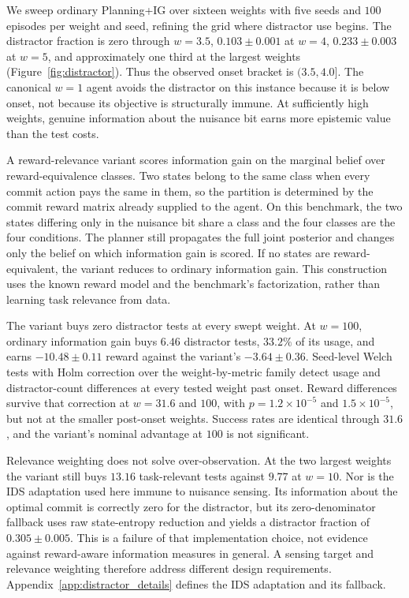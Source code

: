 \documentclass[manuscript, screen, review]{jair}
\begin{document}
We sweep ordinary Planning+IG over sixteen weights with five seeds and $100$ episodes per weight and seed, refining the grid where distractor use begins. The distractor fraction is zero through $w{=}3.5$, $0.103\pm0.001$ at $w{=}4$, $0.233\pm0.003$ at $w{=}5$, and approximately one third at the largest weights (Figure~\ref{fig:distractor}). Thus the observed onset bracket is $(3.5,4.0]$. The canonical $w{=}1$ agent avoids the distractor on this instance because it is below onset, not because its objective is structurally immune. At sufficiently high weights, genuine information about the nuisance bit earns more epistemic value than the test costs.

A reward-relevance variant scores information gain on the marginal belief over reward-equivalence classes. Two states belong to the same class when every commit action pays the same in them, so the partition is determined by the commit reward matrix already supplied to the agent. On this benchmark, the two states differing only in the nuisance bit share a class and the four classes are the four conditions. The planner still propagates the full joint posterior and changes only the belief on which information gain is scored. If no states are reward-equivalent, the variant reduces to ordinary information gain. This construction uses the known reward model and the benchmark's factorization, rather than learning task relevance from data.

The variant buys zero distractor tests at every swept weight. At $w{=}100$, ordinary information gain buys $6.46$ distractor tests, $33.2\%$ of its usage, and earns $-10.48\pm0.11$ reward against the variant's $-3.64\pm0.36$. Seed-level Welch tests with Holm correction over the weight-by-metric family detect usage and distractor-count differences at every tested weight past onset. Reward differences survive that correction at $w{=}31.6$ and $100$, with $p=1.2{\times}10^{-5}$ and $1.5{\times}10^{-5}$, but not at the smaller post-onset weights. Success rates are identical through $31.6$, and the variant's nominal advantage at $100$ is not significant.

Relevance weighting does not solve over-observation. At the two largest weights the variant still buys $13.16$ task-relevant tests against $9.77$ at $w{=}10$. Nor is the IDS adaptation used here immune to nuisance sensing. Its information about the optimal commit is correctly zero for the distractor, but its zero-denominator fallback uses raw state-entropy reduction and yields a distractor fraction of $0.305\pm0.005$. This is a failure of that implementation choice, not evidence against reward-aware information measures in general. A sensing target and relevance weighting therefore address different design requirements. Appendix~\ref{app:distractor_details} defines the IDS adaptation and its fallback.
\end{document}
